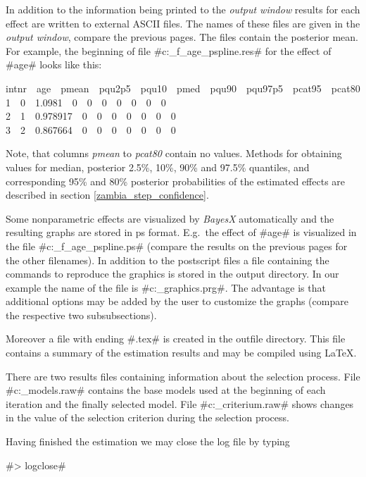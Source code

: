 \documentclass[11pt,a4paper,twoside]{bayesxreport}
\begin{document}
In addition to the information being printed to the {\em output
window} results for each effect are written to external ASCII files.
The names of these files are given in the {\em output window},
compare the previous pages. The files contain the posterior mean.
For example, the beginning of file #c:\data\s_f_age_pspline.res# for
the effect of #age# looks like this:

{\footnotesize
intnr \,\, age \,\, pmean \,\, pqu2p5 \,\, pqu10 \,\, pmed \,\, pqu90 \,\, pqu97p5 \,\, pcat95 \,\, pcat80\\
1 \,\,  0 \,\,  1.0981 \,\,  0 \,\,  0 \,\,  0 \,\,  0 \,\,  0 \,\,  0 \,\,  0 \\
2 \,\,  1 \,\,  0.978917 \,\,  0 \,\,  0 \,\,  0 \,\,  0 \,\,  0 \,\,  0 \,\,  0 \\
3 \,\,  2 \,\,  0.867664 \,\,  0  \,\, 0 \,\,  0 \,\,  0 \,\,  0
\,\,  0 \,\,  0}

Note, that columns {\it pmean} to {\it pcat80} contain no values.
Methods for obtaining values for median, posterior 2.5\%, 10\%, 90\%
and 97.5\% quantiles, and corresponding 95\% and 80\% posterior
probabilities of the estimated effects are described in section
\autoref{zambia_step_confidence}.

Some nonparametric effects are visualized by {\em BayesX}
automatically and the resulting graphs are stored in ps format.
E.g.~the effect of #age# is visualized in the file
#c:\data\s_f_age_pspline.ps# (compare the results on the previous
pages for the other filenames). In addition to the postscript files
a file containing the commands to reproduce the graphics is stored
in the output directory. In our example the name of the file is
#c:\data\s_graphics.prg#. The advantage is that additional options
may be added by the user to customize the graphs (compare the
respective two subsubsections).

Moreover a file with ending #.tex# is created in the outfile
directory. This file contains a summary of the estimation results
and may be compiled using \LaTeX.

There are two results files containing information about the
selection process. File #c:\data\s_models.raw# contains the base
models used at the beginning of each iteration and the finally
selected model. File #c:\data\s_criterium.raw# shows changes in the
value of the selection criterion during the selection process.

Having finished the estimation we may close the log file by typing

#> logclose#
\end{document}
